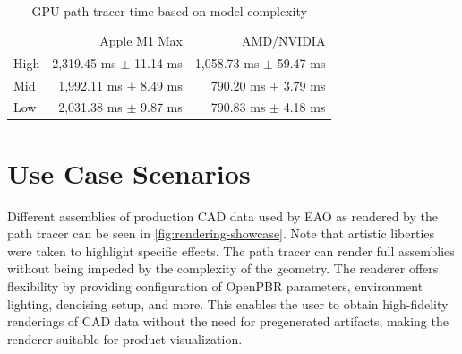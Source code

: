 \begin{table}[H]
  \centering
  \begin{tabular}{lrr}
    \toprule
    & Apple M1 Max    & AMD/NVIDIA \\
    High     & 2,319.45 ms $\pm$ 11.14 ms    & 1,058.73 ms $\pm$ 59.47 ms \\
    Mid     & 1,992.11 ms $\pm$ 8.49 ms    & 790.20 ms $\pm$ 3.79 ms\\
    Low     & 2,031.38 ms $\pm$ 9.87 ms    & 790.83 ms $\pm$ 4.18 ms \\
    \bottomrule
  \end{tabular}
  \caption{\gls{GPU} path tracer time based on model complexity}
  \label{tab:gpuPerformance}
\end{table}
  
\newpage
\section{Use Case Scenarios}

Different assemblies of production \gls{CAD} data used by EAO as rendered by the path tracer can be seen in \autoref{fig:rendering-showcase}. Note that artistic liberties were taken to highlight specific effects. The path tracer can render full assemblies without being impeded by the complexity of the geometry. The renderer offers flexibility by providing configuration of \gls{OpenPBR} parameters, environment lighting, denoising setup, and more. This enables the user to obtain high-fidelity renderings of \gls{CAD} data without the need for pregenerated artifacts, making the renderer suitable for product visualization.

